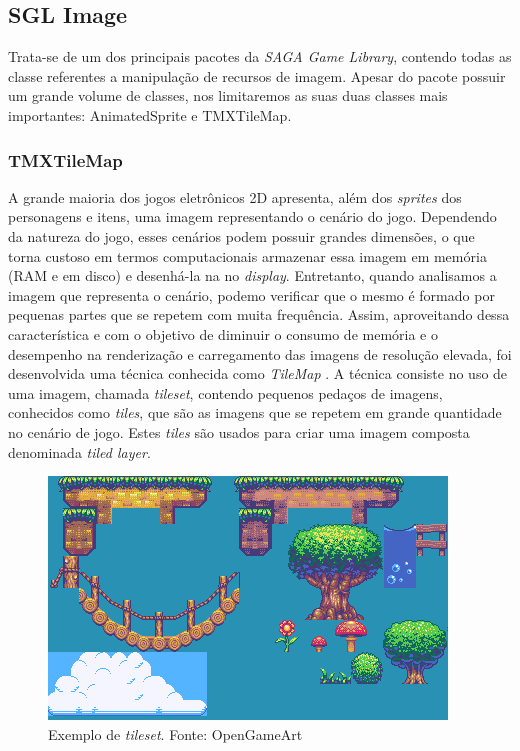 \subsection{SGL Image}
%
Trata-se de um dos principais pacotes da \textit{SAGA Game Library}, contendo todas as classe referentes a manipulação de recursos de imagem. Apesar do pacote possuir um grande volume de classes, nos limitaremos as suas duas classes mais importantes: AnimatedSprite e TMXTileMap.
%
%
%
\subsubsection{TMXTileMap}
%
%
%
A grande maioria dos jogos eletrônicos 2D apresenta, além dos \textit{sprites} dos personagens e itens, uma imagem representando o cenário do jogo. Dependendo da natureza do jogo, esses cenários podem possuir grandes dimensões, o que torna custoso em termos computacionais armazenar essa imagem em memória (RAM e em disco) e desenhá-la na no \textit{display}. Entretanto, quando analisamos a imagem que representa o cenário, podemo verificar que o mesmo é formado por pequenas partes que se repetem com muita frequência. Assim, aproveitando dessa característica e com o objetivo de diminuir o consumo de memória e o desempenho na renderização e carregamento das imagens de resolução elevada, foi desenvolvida uma técnica conhecida como \textit{TileMap} \cite{Novak}. A técnica consiste no uso de uma imagem, chamada \textit{tileset}, contendo pequenos pedaços de imagens, conhecidos como \textit{tiles}, que são as imagens que se repetem em grande quantidade no cenário de jogo. Estes \textit{tiles} são usados para criar uma imagem composta denominada \textit{tiled layer}.
%
%
\begin{figure}[H]
    \centering
    \includegraphics[scale = 1.0]{Imagens/tileset_edit.png}
    \caption{Exemplo de \textit{tileset}. Fonte: OpenGameArt}
    \label{tileset_edit}
\end{figure}
